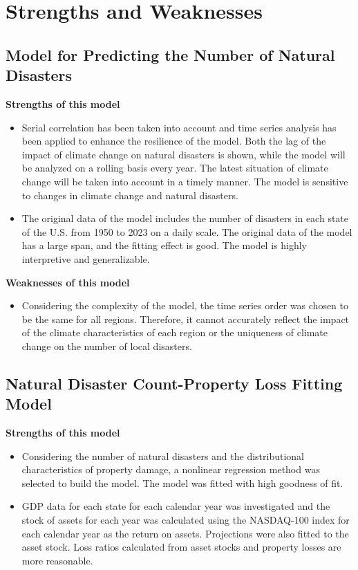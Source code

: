 \documentclass[12pt]{article}  %
\begin{document}
\section{Strengths and Weaknesses}

\subsection{Model for Predicting the Number of Natural Disasters}
\textbf{Strengths of this model}
\begin{itemize}
    \item Serial correlation has been taken into account and time series analysis has been applied to enhance the resilience of the model. Both the lag of the impact of climate change on natural disasters is shown, while the model will be analyzed on a rolling basis every year. The latest situation of climate change will be taken into account in a timely manner. The model is sensitive to changes in climate change and natural disasters.
    \item The original data of the model includes the number of disasters in each state of the U.S. from 1950 to 2023 on a daily scale. The original data of the model has a large span, and the fitting effect is good. The model is highly interpretive and generalizable.
\end{itemize}

\textbf{Weaknesses of this model}
\begin{itemize}
    \item Considering the complexity of the model, the time series order was chosen to be the same for all regions. Therefore, it cannot accurately reflect the impact of the climate characteristics of each region or the uniqueness of climate change on the number of local disasters.
 \end{itemize}
 
\subsection{Natural Disaster Count-Property Loss Fitting Model}
\textbf{Strengths of this model}
\begin{itemize}
    \item Considering the number of natural disasters and the distributional characteristics of property damage, a nonlinear regression method was selected to build the model. The model was fitted with high goodness of fit.
    \item GDP data for each state for each calendar year was investigated and the stock of assets for each year was calculated using the NASDAQ-100 index for each calendar year as the return on assets. Projections were also fitted to the asset stock. Loss ratios calculated from asset stocks and property losses are more reasonable.
\end{itemize}
\end{document}
